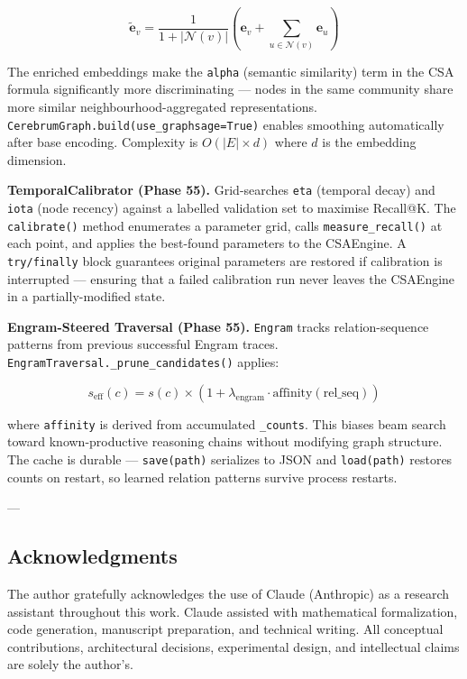 \begin{equation}
\tilde{\mathbf{e}}_v = \frac{1}{1+|\mathcal{N}(v)|}\left(\mathbf{e}_v + \sum_{u \in \mathcal{N}(v)} \mathbf{e}_u\right)
\end{equation}

The enriched embeddings make the \texttt{alpha} (semantic similarity) term in the CSA formula signi\-ficantly more discr\-iminating — nodes in the same community share more similar neigh\-bourhood-aggregated repre\-sentations. \texttt{CerebrumGraph.build(use\_graphsage=True)} enables smoothing autom\-atically after base encoding. Complexity is $O(|E| \times d)$ where $d$ is the embedding dimension.

\textbf{TemporalCalibrator (Phase 55).} Grid-searches \texttt{eta} (temporal decay) and \texttt{iota} (node recency) against a labelled validation set to maximise Recall@K. The \texttt{calibrate()} method enumerates a parameter grid, calls \texttt{measure\_recall()} at each point, and applies the best-found parameters to the CSAEngine. A \texttt{try/finally} block guarantees original parameters are restored if calibration is interrupted — ensuring that a failed calibration run never leaves the CSAEngine in a partially-modified state.

\textbf{Engram-Steered Traversal (Phase 55).} \texttt{Engram} tracks relation-sequence patterns from previous successful Engram traces. \texttt{EngramTraversal.\_prune\_candidates()} applies:

\begin{equation}
s_\text{eff}(c) = s(c) \times (1 + \lambda_\text{engram} \cdot \text{affinity}(\text{rel\_seq}))
\end{equation}

where \texttt{affinity} is derived from accumulated \texttt{\_counts}. This biases beam search toward known-productive reasoning chains without modifying graph structure. The cache is durable — \texttt{save(path)} serializes to JSON and \texttt{load(path)} restores counts on restart, so learned relation patterns survive process restarts.

---
\subsection{Acknow\-ledgments}

The author gratefully ackno\-wledges the use of Claude (Anthropic) as a research assistant throughout this work. Claude assisted with mathe\-matical forma\-lization, code generation, manuscript preparation, and technical writing. All conceptual contr\-ibutions, archi\-tectural decisions, exper\-imental design, and intel\-lectual claims are solely the author's.

